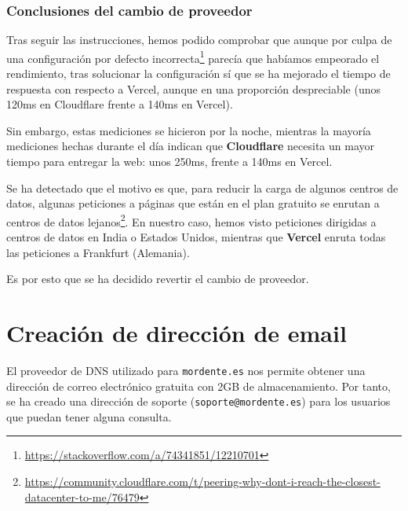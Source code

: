 \subsubsection{Conclusiones del cambio de proveedor}

Tras seguir las instrucciones, hemos podido comprobar que aunque por culpa de una configuración por defecto incorrecta\footnote{\url{https://stackoverflow.com/a/74341851/12210701}} parecía que habíamos empeorado el rendimiento, tras solucionar la configuración sí que se ha mejorado el tiempo de respuesta con respecto a Vercel, aunque en una proporción despreciable (unos 120ms en Cloudflare frente a 140ms en Vercel).

Sin embargo, estas mediciones se hicieron por la noche, mientras la mayoría mediciones hechas durante el día indican que \textbf{Cloudflare} necesita un mayor tiempo para entregar la web: unos 250ms, frente a 140ms en Vercel.

Se ha detectado que el motivo es que, para reducir la carga de algunos centros de datos, algunas peticiones a páginas que están en el plan gratuito se enrutan a centros de datos lejanos\footnote{\url{https://community.cloudflare.com/t/peering-why-dont-i-reach-the-closest-datacenter-to-me/76479}}. En nuestro caso, hemos visto peticiones dirigidas a centros de datos en India o Estados Unidos, mientras que \textbf{Vercel} enruta todas las peticiones a Frankfurt (Alemania).

Es por esto que se ha decidido revertir el cambio de proveedor.


\section{Creación de dirección de email}

El proveedor de DNS utilizado para \texttt{mordente.es} nos permite obtener una dirección de correo electrónico gratuita con 2GB de almacenamiento. Por tanto, se ha creado una dirección 
de soporte (\texttt{soporte@mordente.es}) para los usuarios que puedan tener alguna consulta.

